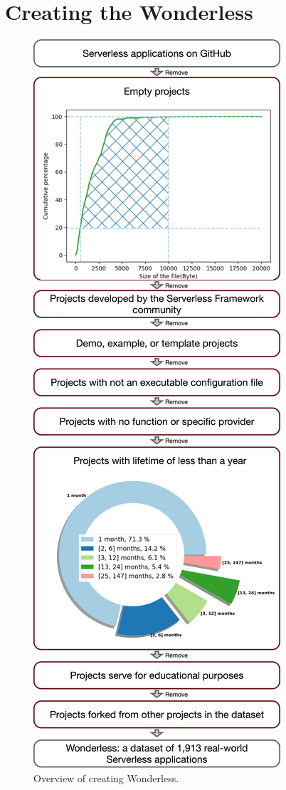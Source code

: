 \section{Creating the Wonderless}
\label{dataset}

\begin{figure}
	\centering
	\includegraphics[scale=0.55]{figures/processOverview}
	\caption{Overview of creating Wonderless.}
	\label{fig:overview}
\end{figure}


